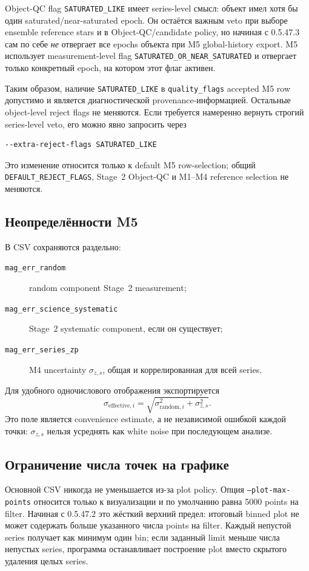 Object-QC flag \texttt{SATURATED\_LIKE} имеет series-level смысл: объект имел хотя бы один saturated/near-saturated epoch. Он остаётся важным veto при выборе ensemble reference stars и в Object-QC/candidate policy, но начиная с 0.5.47.3 сам по себе \emph{не} отвергает все epochs объекта при M5 global-history export. M5 использует measurement-level flag \texttt{SATURATED\_OR\_NEAR\_SATURATED} и отвергает только конкретный epoch, на котором этот флаг активен.

Таким образом, наличие \texttt{SATURATED\_LIKE} в \texttt{quality\_flags} accepted M5 row допустимо и является диагностической provenance-информацией. Остальные object-level reject flags не меняются. Если требуется намеренно вернуть строгий series-level veto, его можно явно запросить через
\begin{lstlisting}
--extra-reject-flags SATURATED_LIKE
\end{lstlisting}
Это изменение относится только к default M5 row-selection; общий \texttt{DEFAULT\_REJECT\_FLAGS}, Stage~2 Object-QC и M1--M4 reference selection не меняются.

\subsection{Неопределённости M5}

В CSV сохраняются раздельно:

\begin{description}
  \item[\texttt{mag\_err\_random}] random component Stage~2 measurement;
  \item[\texttt{mag\_err\_science\_systematic}] Stage~2 systematic component, если он существует;
  \item[\texttt{mag\_err\_series\_zp}] M4 uncertainty $\sigma_{z,s}$, общая и коррелированная для всей series.
\end{description}

Для удобного одночислового отображения экспортируется
\[
  \sigma_{\mathrm{effective},i}
  =\sqrt{\sigma_{\mathrm{random},i}^2+\sigma_{z,s}^2}.
\]
Это поле является convenience estimate, а не независимой ошибкой каждой точки: $\sigma_{z,s}$ нельзя усреднять как white noise при последующем анализе.

\subsection{Ограничение числа точек на графике}

Основной CSV никогда не уменьшается из-за plot policy. Опция \texttt{--plot-max-points} относится только к визуализации и по умолчанию равна 5000 points на filter. Начиная с 0.5.47.2 это жёсткий верхний предел: итоговый binned plot не может содержать больше указанного числа points на filter. Каждый непустой series получает как минимум один bin; если заданный limit меньше числа непустых series, программа останавливает построение plot вместо скрытого удаления целых series.


